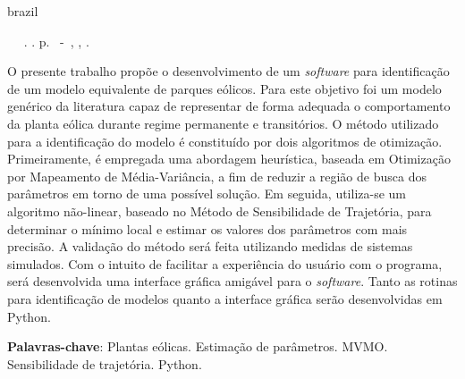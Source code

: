 \setlength{\absparsep}{18pt} %

\begin{resumo}[Resumo]

\begin{otherlanguage*}{brazil}

\begin{flushleft} 
	\setlength{\absparsep}{0pt} %
	\SingleSpacing 
	\imprimirautorabr~ ~\textbf{\imprimirtitleabstract}.	\imprimirdata. \pageref{LastPage}p. 
	\imprimirtipotrabalho~-~\imprimirinstituicao, \imprimirlocal, \imprimirdata. 
\end{flushleft}

\OnehalfSpacing 			

O presente trabalho prop\~oe o desenvolvimento de um \textit{software} para identifica\c{c}\~ao de um modelo equivalente de parques e\'olicos. Para este objetivo foi um modelo gen\'erico da literatura capaz de representar de forma adequada o comportamento da planta e\'olica durante regime permanente e transit\'orios. O m\'etodo utilizado para a identifica\c{c}\~ao do modelo \'e constitu\'ido por dois algoritmos de otimiza\c{c}\~ao. Primeiramente, \'e empregada uma abordagem heur\'istica, baseada em Otimiza\c{c}\~ao por Mapeamento de M\'edia-Vari\^ancia, a fim de reduzir a regi\~ao de busca dos par\^ametros em torno de uma poss\'ivel solu\c{c}\~ao. Em seguida, utiliza-se um algoritmo n\~ao-linear, baseado no M\'etodo de Sensibilidade de Trajet\'oria, para determinar o m\'inimo local e estimar os valores dos par\^ametros com mais precis\~ao. A valida\c{c}\~ao do m\'etodo ser\'a feita utilizando medidas de sistemas simulados. Com o intuito de facilitar a experi\^encia do usu\'ario com o programa, ser\'a desenvolvida uma interface gr\'afica amig\'avel para o \textit{software}. Tanto as rotinas para identifica\c{c}\~ao de modelos quanto a interface gr\'afica ser\~ao desenvolvidas em Python.
 

\textbf{Palavras-chave}: Plantas e\'olicas. Estima\c{c}\~ao de par\^ametros. MVMO. Sensibilidade de trajet\'oria. Python.

\end{otherlanguage*}

\end{resumo}